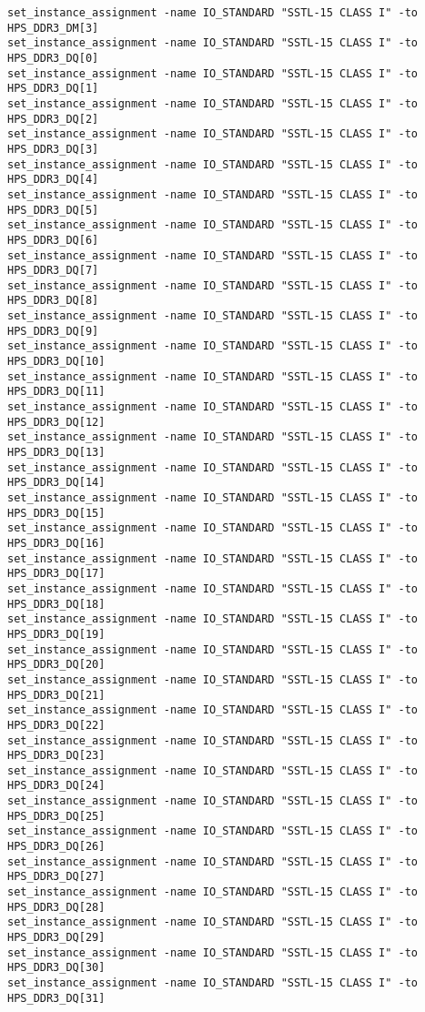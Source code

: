 \begin{verbatim}
set_instance_assignment -name IO_STANDARD "SSTL-15 CLASS I" -to HPS_DDR3_DM[3]
set_instance_assignment -name IO_STANDARD "SSTL-15 CLASS I" -to HPS_DDR3_DQ[0]
set_instance_assignment -name IO_STANDARD "SSTL-15 CLASS I" -to HPS_DDR3_DQ[1]
set_instance_assignment -name IO_STANDARD "SSTL-15 CLASS I" -to HPS_DDR3_DQ[2]
set_instance_assignment -name IO_STANDARD "SSTL-15 CLASS I" -to HPS_DDR3_DQ[3]
set_instance_assignment -name IO_STANDARD "SSTL-15 CLASS I" -to HPS_DDR3_DQ[4]
set_instance_assignment -name IO_STANDARD "SSTL-15 CLASS I" -to HPS_DDR3_DQ[5]
set_instance_assignment -name IO_STANDARD "SSTL-15 CLASS I" -to HPS_DDR3_DQ[6]
set_instance_assignment -name IO_STANDARD "SSTL-15 CLASS I" -to HPS_DDR3_DQ[7]
set_instance_assignment -name IO_STANDARD "SSTL-15 CLASS I" -to HPS_DDR3_DQ[8]
set_instance_assignment -name IO_STANDARD "SSTL-15 CLASS I" -to HPS_DDR3_DQ[9]
set_instance_assignment -name IO_STANDARD "SSTL-15 CLASS I" -to HPS_DDR3_DQ[10]
set_instance_assignment -name IO_STANDARD "SSTL-15 CLASS I" -to HPS_DDR3_DQ[11]
set_instance_assignment -name IO_STANDARD "SSTL-15 CLASS I" -to HPS_DDR3_DQ[12]
set_instance_assignment -name IO_STANDARD "SSTL-15 CLASS I" -to HPS_DDR3_DQ[13]
set_instance_assignment -name IO_STANDARD "SSTL-15 CLASS I" -to HPS_DDR3_DQ[14]
set_instance_assignment -name IO_STANDARD "SSTL-15 CLASS I" -to HPS_DDR3_DQ[15]
set_instance_assignment -name IO_STANDARD "SSTL-15 CLASS I" -to HPS_DDR3_DQ[16]
set_instance_assignment -name IO_STANDARD "SSTL-15 CLASS I" -to HPS_DDR3_DQ[17]
set_instance_assignment -name IO_STANDARD "SSTL-15 CLASS I" -to HPS_DDR3_DQ[18]
set_instance_assignment -name IO_STANDARD "SSTL-15 CLASS I" -to HPS_DDR3_DQ[19]
set_instance_assignment -name IO_STANDARD "SSTL-15 CLASS I" -to HPS_DDR3_DQ[20]
set_instance_assignment -name IO_STANDARD "SSTL-15 CLASS I" -to HPS_DDR3_DQ[21]
set_instance_assignment -name IO_STANDARD "SSTL-15 CLASS I" -to HPS_DDR3_DQ[22]
set_instance_assignment -name IO_STANDARD "SSTL-15 CLASS I" -to HPS_DDR3_DQ[23]
set_instance_assignment -name IO_STANDARD "SSTL-15 CLASS I" -to HPS_DDR3_DQ[24]
set_instance_assignment -name IO_STANDARD "SSTL-15 CLASS I" -to HPS_DDR3_DQ[25]
set_instance_assignment -name IO_STANDARD "SSTL-15 CLASS I" -to HPS_DDR3_DQ[26]
set_instance_assignment -name IO_STANDARD "SSTL-15 CLASS I" -to HPS_DDR3_DQ[27]
set_instance_assignment -name IO_STANDARD "SSTL-15 CLASS I" -to HPS_DDR3_DQ[28]
set_instance_assignment -name IO_STANDARD "SSTL-15 CLASS I" -to HPS_DDR3_DQ[29]
set_instance_assignment -name IO_STANDARD "SSTL-15 CLASS I" -to HPS_DDR3_DQ[30]
set_instance_assignment -name IO_STANDARD "SSTL-15 CLASS I" -to HPS_DDR3_DQ[31]

\end{verbatim}
